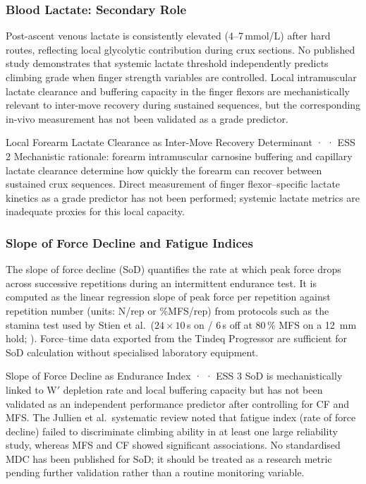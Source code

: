 \subsubsection{Blood Lactate: Secondary Role}

Post-ascent venous lactate is consistently elevated (4--7\,mmol/L) after hard routes, reflecting local glycolytic contribution during crux sections.
No published study demonstrates that systemic lactate threshold independently predicts climbing grade when finger strength variables are controlled.
Local intramuscular lactate clearance and buffering capacity in the finger flexors are mechanistically relevant to inter-move recovery during sustained sequences, but the corresponding in-vivo measurement has not been validated as a grade predictor.

\begin{bioplausbox}{Local Forearm Lactate Clearance as Inter-Move Recovery Determinant · \bioplausible · ESS 2}
Mechanistic rationale: forearm intramuscular carnosine buffering and capillary lactate clearance determine how quickly the forearm can recover between sustained crux sequences.
Direct measurement of finger flexor--specific lactate kinetics as a grade predictor has not been performed; systemic lactate metrics are inadequate proxies for this local capacity.
\end{bioplausbox}

\subsubsection{Slope of Force Decline and Fatigue Indices}

The slope of force decline (SoD) quantifies the rate at which peak force drops across successive repetitions during an intermittent endurance test.
It is computed as the linear regression slope of peak force per repetition against repetition number (units: N/rep or \%MFS/rep) from protocols such as the stamina test used by Stien et al.\ ($24 \times 10$\,s on / 6\,s off at 80\,\% MFS on a 12~mm hold; \cite{DO22}).
Force--time data exported from the Tindeq Progressor are sufficient for SoD calculation without specialised laboratory equipment.

\begin{bioplausbox}{Slope of Force Decline as Endurance Index · \bioplausible · ESS 3}
SoD is mechanistically linked to W$'$ depletion rate and local buffering capacity but has not been validated as an independent performance predictor after controlling for CF and MFS.
The Jullien et al.\ systematic review \cite{TEMP_Jullien2025} noted that fatigue index (rate of force decline) failed to discriminate climbing ability in at least one large reliability study, whereas MFS and CF showed significant associations.
No standardised MDC has been published for SoD; it should be treated as a research metric pending further validation rather than a routine monitoring variable.
\end{bioplausbox}

